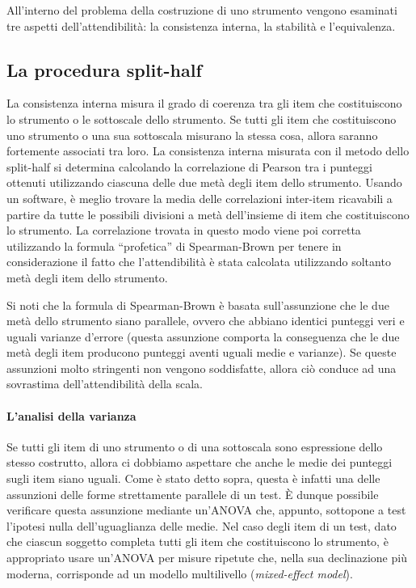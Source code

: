 All'interno del problema della costruzione di uno strumento vengono esaminati tre aspetti dell'attendibilità: la consistenza interna, la stabilità e l'equivalenza.

\subsection{La procedura split-half}

La consistenza interna misura il grado di coerenza tra gli item che costituiscono lo strumento o le sottoscale dello strumento. Se tutti gli item che costituiscono uno strumento o una sua sottoscala misurano la stessa cosa, allora saranno fortemente associati tra loro. 
La consistenza interna misurata con il metodo dello split-half si determina calcolando la correlazione di Pearson tra i punteggi ottenuti utilizzando ciascuna delle due metà degli item dello strumento.  Usando un software, è meglio trovare la media delle correlazioni inter-item ricavabili a partire da tutte le possibili divisioni a metà dell'insieme di item che costituiscono lo strumento. La correlazione trovata in questo modo viene poi corretta utilizzando la formula ``profetica'' di Spearman-Brown per tenere in considerazione il fatto che l'attendibilità è stata calcolata utilizzando soltanto metà degli item dello strumento.

Si noti che la formula di Spearman-Brown è basata sull'assunzione che le due metà dello strumento siano parallele, ovvero che abbiano identici punteggi veri e uguali varianze d'errore (questa assunzione comporta la conseguenza che le due metà degli item producono punteggi aventi uguali medie e varianze).  Se queste assunzioni molto stringenti non vengono soddisfatte, allora ciò conduce ad una sovrastima dell'attendibilità della scala. 

\paragraph{L'analisi della varianza}

Se tutti gli item di uno strumento o di una sottoscala sono espressione dello stesso costrutto, allora ci dobbiamo aspettare che anche le medie dei punteggi sugli item siano uguali. Come è stato detto sopra, questa è infatti una delle assunzioni delle forme strettamente parallele di un test. È dunque possibile verificare questa assunzione mediante un'ANOVA che, appunto, sottopone a test l'ipotesi nulla dell'uguaglianza delle medie. Nel caso degli item di un test, dato che ciascun soggetto completa tutti gli item che costituiscono lo strumento, è appropriato usare un'ANOVA per misure ripetute che, nella sua declinazione più moderna, corrisponde ad un modello multilivello (\emph{mixed-effect model}).

